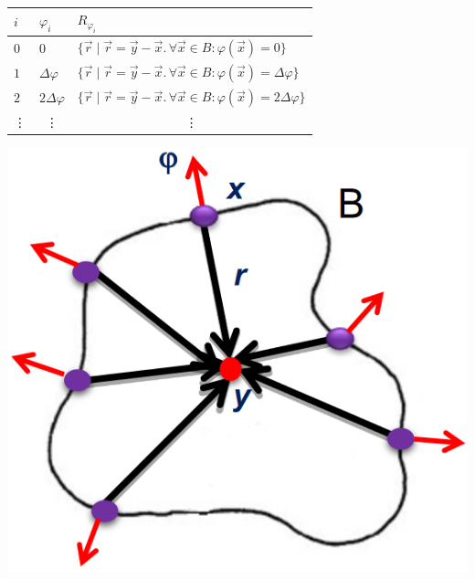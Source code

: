 \begin{description}
        \begin{example}
            \phantom{}\\[0.5em]
            \begin{minipage}{0.7\linewidth}
                \small
                \begin{tabular}{lll}
                    \toprule
                    $i$ & $\varphi_i$ & $R_{\varphi_i}$ \\
                    \midrule
                    $0$ & $0$                   & $\{ \vec{r} \mid \vec{r}=\vec{y}-\vec{x}.\, \forall \vec{x} \in B: \varphi(\vec{x}) = 0 \}$ \\
                    $1$ & $\Delta\varphi$       & $\{ \vec{r} \mid \vec{r}=\vec{y}-\vec{x}.\, \forall \vec{x} \in B: \varphi(\vec{x}) = \Delta\varphi \}$ \\
                    $2$ & $2\Delta\varphi$      & $\{ \vec{r} \mid \vec{r}=\vec{y}-\vec{x}.\, \forall \vec{x} \in B: \varphi(\vec{x}) = 2\Delta\varphi \}$ \\
                    \multicolumn{1}{c}{\vdots} & \multicolumn{1}{c}{\vdots} & \multicolumn{1}{c}{\vdots} \\
                    \bottomrule
                \end{tabular}
            \end{minipage}
            \begin{minipage}{0.2\linewidth}
                \centering
                \includegraphics[width=\linewidth]{./img/generalized_hough_offline.png}
            \end{minipage}
        \end{example}


\end{description}
